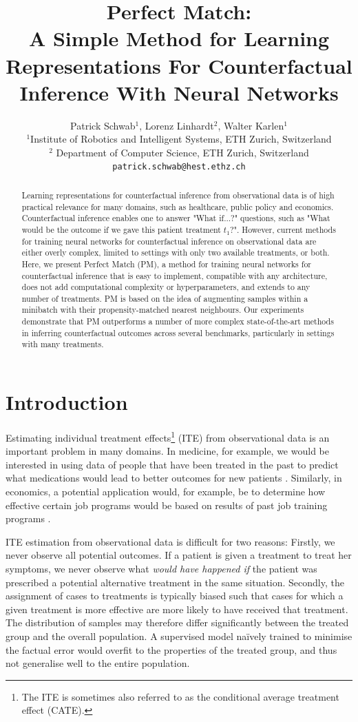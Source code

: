\documentclass{article}
\title{Perfect Match:\\ A Simple Method for Learning Representations For Counterfactual Inference With Neural Networks}
\author{
  Patrick Schwab$^{1}$, Lorenz Linhardt$^{2}$, Walter Karlen$^{1}$ \\
  $^{1}$Institute of Robotics and Intelligent Systems, ETH Zurich, Switzerland \\
  $^2$ Department of Computer Science, ETH Zurich, Switzerland\\
  \texttt{patrick.schwab@hest.ethz.ch} \\
}
\begin{document}
\maketitle
\vspace{-3ex}

\begin{abstract}
Learning representations for counterfactual inference from observational data is of high practical relevance for many domains, such as healthcare, public policy and economics. Counterfactual inference enables one to answer "What if...?" questions, such as "What would be the outcome if we gave this patient treatment $t_1$?". However, current methods for training neural networks for counterfactual inference on observational data are either overly complex, limited to settings with only two available treatments, or both. Here, we present Perfect Match (PM), a method for training neural networks for counterfactual inference that is easy to implement, compatible with any architecture, does not add computational complexity or hyperparameters, and extends to any number of treatments. PM is based on the idea of augmenting samples within a minibatch with their propensity-matched nearest neighbours. Our experiments demonstrate that PM outperforms a number of more complex state-of-the-art methods in inferring counterfactual outcomes across several benchmarks, particularly in settings with many treatments.
\end{abstract}
\vspace{-3ex}

\section{Introduction}
Estimating individual treatment effects\footnote{The ITE is sometimes also referred to as the conditional average treatment effect (CATE).} (ITE) from observational data is an important problem in many domains. In medicine, for example, we would be interested in using data of people that have been treated in the past to predict what medications would lead to better outcomes for new patients \cite{shalit2016estimating}. Similarly, in economics, a potential application would, for example, be to determine how effective certain job programs would be based on results of past job training programs \cite{lalonde1986evaluating}. 

ITE estimation from observational data is difficult for two reasons: Firstly, we never observe all potential outcomes. If a patient is given a treatment to treat her symptoms, we never observe what \textit{would have happened if} the patient was prescribed a potential alternative treatment in the same situation. Secondly, the assignment of cases to treatments is typically biased such that cases for which a given treatment is more effective are more likely to have received that treatment. The distribution of samples may therefore differ significantly between the treated group and the overall population. A supervised model na\"ively trained to minimise the factual error would overfit to the properties of the treated group, and thus not generalise well to the entire population. 
\end{document}
